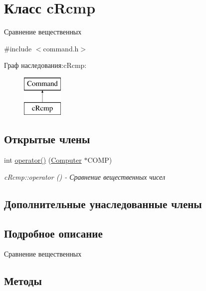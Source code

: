 \hypertarget{classc_rcmp}{}\section{Класс c\+Rcmp}
\label{classc_rcmp}


Сравнение вещественных  




{\ttfamily \#include $<$command.\+h$>$}

Граф наследования\+:c\+Rcmp\+:\begin{figure}[H]
\begin{center}
\leavevmode
\includegraphics[height=2.000000cm]{classc_rcmp}
\end{center}
\end{figure}
\subsection*{Открытые члены}
\begin{DoxyCompactItemize}
\item 
int \hyperlink{classc_rcmp_a4053dd11e7f5f61ac61df639c425cf08}{operator()} (\hyperlink{class_computer}{Computer} $\ast$C\+O\+MP)
\begin{DoxyCompactList}\small\item\em c\+Rcmp\+::operator () -\/ Сравнение вещественных чисел \end{DoxyCompactList}\end{DoxyCompactItemize}
\subsection*{Дополнительные унаследованные члены}


\subsection{Подробное описание}
Сравнение вещественных 

\subsection{Методы}
\hypertarget{classc_rcmp_a4053dd11e7f5f61ac61df639c425cf08}{}\label{classc_rcmp_a4053dd11e7f5f61ac61df639c425cf08} 

